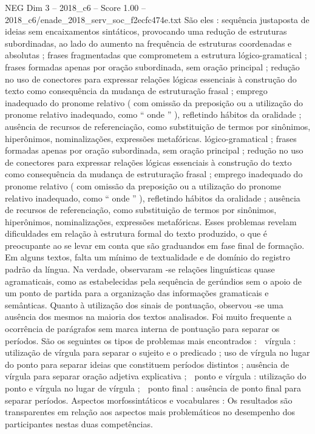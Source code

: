 \begin{textsample}{NEG Dim 3 – 2018\_c6 – Score 1.00 – 2018\_c6/enade\_2018\_serv\_soc\_f2ecfc474e.txt}
São eles : sequência justaposta de ideias sem encaixamentos sintáticos, provocando uma redução de estruturas subordinadas, ao lado do aumento na frequência de estruturas coordenadas e absolutas ; frases fragmentadas que comprometem a estrutura lógico-gramatical ; frases formadas apenas por oração subordinada, sem oração principal ; redução no uso de conectores para expressar relações lógicas essenciais à construção do texto como consequência da mudança de estruturação frasal ; emprego inadequado do pronome relativo ( com omissão da preposição ou a utilização do pronome relativo inadequado, como “ onde ” ), refletindo hábitos da oralidade ; ausência de recursos de referenciação, como substituição de termos por sinônimos, hiperônimos, nominalizações, expressões metafóricas. lógico-gramatical ; frases formadas apenas por oração subordinada, sem oração principal ; redução no uso de conectores para expressar relações lógicas essenciais à construção do texto como consequência da mudança de estruturação frasal ; emprego inadequado do pronome relativo ( com omissão da preposição ou a utilização do pronome relativo inadequado, como “ onde ” ), refletindo hábitos da oralidade ; ausência de recursos de referenciação, como substituição de termos por sinônimos, hiperônimos, nominalizações, expressões metafóricas.
Esses problemas revelam dificuldades em relação à estrutura formal do texto produzido, o que é preocupante ao se levar em conta que são graduandos em fase final de formação.
Em alguns textos, falta um mínimo de textualidade e de domínio do registro padrão da língua.
Na verdade, observaram -se relações linguísticas quase agramaticais, como as estabelecidas pela sequência de gerúndios sem o apoio de um ponto de partida para a organização das informações gramaticais e semânticas.
Quanto à utilização dos sinais de pontuação, observou -se uma ausência dos mesmos na maioria dos textos analisados.
Foi muito frequente a ocorrência de parágrafos sem marca interna de pontuação para separar os períodos.
São os seguintes os tipos de problemas mais encontrados :  vírgula : utilização de vírgula para separar o sujeito e o predicado ; uso de vírgula no lugar do ponto para separar ideias que constituem períodos distintos ; ausência de vírgula para separar oração adjetiva explicativa ;  ponto e vírgula : utilização do ponto e vírgula no lugar de vírgula ;  ponto final : ausência de ponto final para separar períodos.
Aspectos morfossintáticos e vocabulares : Os resultados são transparentes em relação aos aspectos mais problemáticos no desempenho dos participantes nestas duas competências.

\end{textsample}
